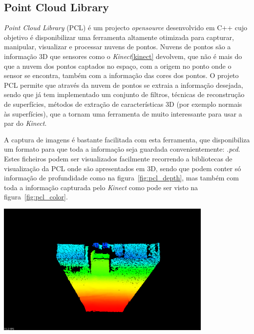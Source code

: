 \subsection[PCL]{Point Cloud Library}

\emph{Point Cloud Library} (PCL) é um projecto \emph{opensource} desenvolvido em C++ cujo objetivo é disponibilizar uma ferramenta altamente otimizada para capturar, manipular, visualizar e processar nuvens de pontos. Nuvens de pontos são a informação 3D que sensores como o \emph{Kinect}\ref{kinect} devolvem, que não é mais do que a nuvem dos pontos captados no espaço, com a origem no ponto onde o sensor se encontra, também com a informação das cores dos pontos.
O projeto PCL \cite{Rusu_ICRA2011_PCL} permite que
através da nuvem de pontos se extraia a informação desejada, sendo que
já tem implementado um conjunto de filtros, técnicas de reconstrução de
superfícies, métodos de extração de características 3D (por exemplo
normais às superfícies), que a tornam uma ferramenta de muito interessante para usar a par do \emph{Kinect}.

A captura de imagens é bastante facilitada com esta ferramenta, que disponibiliza um formato para que toda a informação seja guardada convenientemente: \emph{.pcd}. Estes ficheiros podem ser visualizados facilmente recorrendo a bibliotecas de visualização da PCL onde são apresentados em 3D, sendo que podem conter só informação de profundidade como na figura~\ref{fig:pcl_depth}, mas também com toda a informação capturada pelo \emph{Kinect} como pode ser visto na figura~\ref{fig:pcl_color}.

\begin{center}
	\includegraphics[width=0.80\textwidth]{figures/pcl_openni.png}
	\label{fig:pcl_depth}
	
\end{center}

